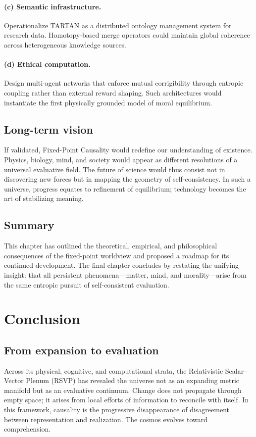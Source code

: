 \documentclass[12pt,a4paper]{article}
\theoremstyle{plain}
\begin{document}
\paragraph{(c) Semantic infrastructure.}
Operationalize TARTAN as a distributed ontology management system for research data.
Homotopy-based merge operators could maintain global coherence across heterogeneous knowledge sources.

\paragraph{(d) Ethical computation.}
Design multi-agent networks that enforce mutual corrigibility through entropic coupling rather than external reward shaping.
Such architectures would instantiate the first physically grounded model of moral equilibrium.

\subsection{Long-term vision}
If validated, Fixed-Point Causality would redefine our understanding of existence.
Physics, biology, mind, and society would appear as different resolutions of a universal evaluative field.
The future of science would thus consist not in discovering new forces but in mapping the geometry of self-consistency.
In such a universe, progress equates to refinement of equilibrium; technology becomes the art of stabilizing meaning.

\subsection{Summary}
This chapter has outlined the theoretical, empirical, and philosophical consequences of the fixed-point worldview and proposed a roadmap for its continued development.
The final chapter concludes by restating the unifying insight: that all persistent phenomena—matter, mind, and morality—arise from the same entropic pursuit of self-consistent evaluation.


\section{Conclusion}
\label{sec:conclusion}

\subsection{From expansion to evaluation}
Across its physical, cognitive, and computational strata, the Relativistic Scalar--Vector Plenum (RSVP) has revealed the universe not as an expanding metric manifold but as an evaluative continuum.  
Change does not propagate through empty space; it arises from local efforts of information to reconcile with itself.  
In this framework, causality is the progressive disappearance of disagreement between representation and realization.  
The cosmos evolves toward comprehension.
\end{document}
